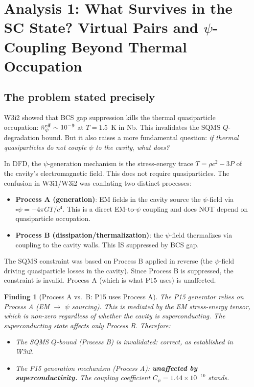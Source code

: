 \documentclass[11pt]{article}
\newtheorem{finding}{Finding}
\newcommand{\ee}[1]{\times 10^{#1}}
\begin{document}
\section{Analysis 1: What Survives in the SC State? Virtual Pairs and
$\psi$-Coupling Beyond Thermal Occupation}
\label{sec:sc-coupling}

\subsection{The problem stated precisely}

W3i2 showed that BCS gap suppression kills the thermal quasiparticle occupation:
$\bar{n}_\psi^{\rm eff} \sim 10^{-9}$ at $T = 1.5$~K in Nb. This invalidates
the SQMS $Q$-degradation bound. But it also raises a more fundamental question:
\emph{if thermal quasiparticles do not couple $\psi$ to the cavity, what does?}

In DFD, the $\psi$-generation mechanism is the stress-energy trace $T = \rho c^2 - 3P$
of the cavity's electromagnetic field. This does not require quasiparticles.
The confusion in W3i1/W3i2 was conflating two distinct processes:
\begin{itemize}
\item \textbf{Process A (generation)}: EM fields in the cavity source the $\psi$-field
via $\square\psi = -4\pi G T/c^4$. This is a direct EM-to-$\psi$ coupling and
does NOT depend on quasiparticle occupation.
\item \textbf{Process B (dissipation/thermalization)}: the $\psi$-field thermalizes
via coupling to the cavity walls. This IS suppressed by BCS gap.
\end{itemize}

The SQMS constraint was based on Process B applied in reverse (the $\psi$-field
driving quasiparticle losses in the cavity). Since Process B is suppressed,
the constraint is invalid. Process A (which is what P15 uses) is unaffected.

\begin{finding}[Process A vs.\ B: P15 uses Process A]
\label{find:process-a}
The P15 generator relies on Process A (EM $\to$ $\psi$ sourcing). This is
mediated by the EM stress-energy tensor, which is non-zero regardless of
whether the cavity is superconducting. The superconducting state affects
only Process B. Therefore:
\begin{itemize}
\item The SQMS $Q$-bound (Process B) is invalidated: correct, as established in W3i2.
\item The P15 generation mechanism (Process A): \textbf{unaffected by
superconductivity.} The coupling coefficient $C_\psi = 1.44\ee{-10}$ stands.
\end{itemize}
\end{finding}
\end{document}
